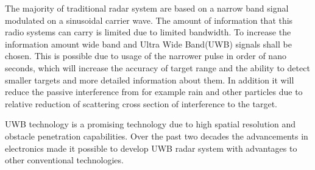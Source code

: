 The majority of traditional radar system are based on a narrow band signal modulated on a sinusoidal carrier wave. The amount of information that this radio systems can carry is limited due to limited bandwidth. To increase the information amount wide band and Ultra Wide Band(UWB) signals shall be chosen. This is possible due to usage of the narrower pulse in order of nano seconds, which will increase the accuracy of target range and the ability to detect smaller targets and more detailed information about them. In addition it will reduce the passive interference from for example rain and other particles due to relative reduction of scattering cross section of interference to the target\cite{taylor2000ultra}.


UWB technology is a promising technology due to high spatial resolution and obstacle penetration capabilities. Over the past two decades the advancements in electronics made it possible to develop UWB radar system with advantages to other conventional technologies\cite{UWBHussain}.

